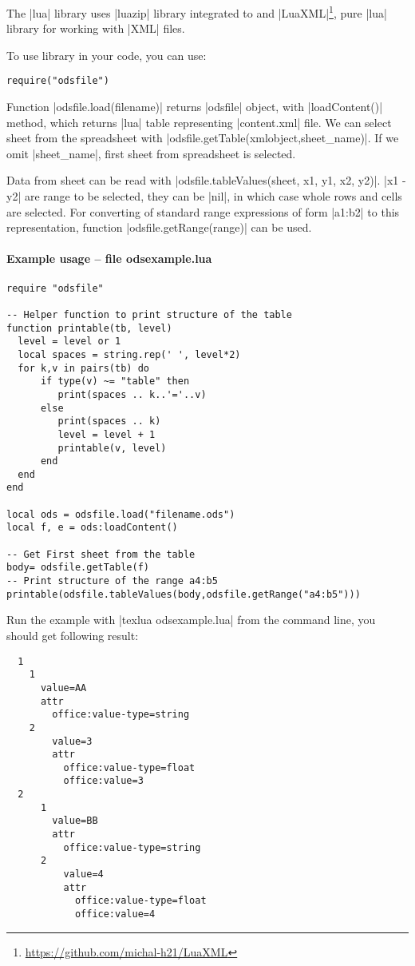 \documentclass{ltxdoc}
\begin{document}
The |lua| library uses |luazip| library integrated to \LuaTeX{} and |LuaXML|\footnote{\url{https://github.com/michal-h21/LuaXML}}, pure |lua| library for working with |XML| files.

To use library in your code, you can use:

\begin{verbatim}
require("odsfile")
\end{verbatim} 

Function |odsfile.load(filename)| returns |odsfile| object, with |loadContent()| method, which returns |lua| table representing |content.xml| file. We can select sheet from the spreadsheet with |odsfile.getTable(xmlobject,sheet_name)|. If we omit |sheet_name|, first sheet from spreadsheet is selected.

Data from sheet can be read with |odsfile.tableValues(sheet, x1, y1, x2, y2)|. |x1 - y2| are range to be selected, they can be |nil|, in which case whole rows and cells are selected. For converting of standard range expressions of form |a1:b2| to this representation, function |odsfile.getRange(range)| can be used.

\paragraph{Example usage -- file \textsf{odsexample.lua}}

\begin{verbatim}
require "odsfile"

-- Helper function to print structure of the table
function printable(tb, level)
  level = level or 1
  local spaces = string.rep(' ', level*2)
  for k,v in pairs(tb) do
      if type(v) ~= "table" then
         print(spaces .. k..'='..v)
      else
         print(spaces .. k)
         level = level + 1
         printable(v, level)
      end
  end
end

local ods = odsfile.load("filename.ods")
local f, e = ods:loadContent()

-- Get First sheet from the table
body= odsfile.getTable(f)
-- Print structure of the range a4:b5  
printable(odsfile.tableValues(body,odsfile.getRange("a4:b5")))
\end{verbatim}

Run the example with |texlua odsexample.lua| from the command line, you should get following result:

\begin{verbatim}
  1
    1
      value=AA
      attr
        office:value-type=string
    2
        value=3
        attr
          office:value-type=float
          office:value=3
  2
      1
        value=BB
        attr
          office:value-type=string
      2
          value=4
          attr
            office:value-type=float
            office:value=4
\end{verbatim}
\end{document}
